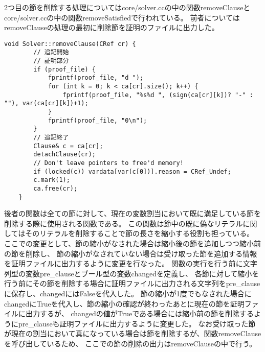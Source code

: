 2つ目の節を削除する処理についてはcore/solver.ccの中の関数removeClauseとcore/solver.ccの中の関数removeSatisfiedで行われている。
前者についてはremoveClauseの処理の最初に削除節を証明のファイルに出力した。
\begin{lstlisting}[caption=関数addClause\_の変更(core/solver.cc), firstnumber=212]
    void Solver::removeClause(CRef cr) {
        // 追記開始
        // 証明部分
        if (proof_file) {
            fprintf(proof_file, "d ");
            for (int k = 0; k < ca[cr].size(); k++) {
                fprintf(proof_file, "%s%d ", (sign(ca[cr][k])? "-" : ""), var(ca[cr][k])+1);
            }
            fprintf(proof_file, "0\n");
        }
        // 追記終了
        Clause& c = ca[cr];
        detachClause(cr);
        // Don't leave pointers to free'd memory!
        if (locked(c)) vardata[var(c[0])].reason = CRef_Undef;
        c.mark(1); 
        ca.free(cr);
    }
\end{lstlisting}
後者の関数は全ての節に対して、現在の変数割当において既に満足している節を削除する際に使用される関数である。
この関数は節中の既に偽なリテラルに関してはそのリテラルを削除することで節の長さを縮小する役割も担っている。
ここでの変更として、節の縮小がなされた場合は縮小後の節を追加しつつ縮小前の節を削除し、
節の縮小がなされていない場合は受け取った節を追加する情報を証明ファイルに出力するように変更を行なった。
関数の実行を行う前に文字列型の変数pre\_clauseとブール型の変数changedを定義し、
各節に対して縮小を行う前にその節を削除する場合に証明ファイルに出力される文字列をpre\_clauseに保存し、changedにはFalseを代入した。
節の縮小が1度でもなされた場合にchangedにTrueを代入し、節の縮小の確認が終わったあとに現在の節を証明ファイルに出力するが、
changedの値がTrueである場合には縮小前の節を削除するようにpre\_clauseも証明ファイルに出力するように変更した。
なお受け取った節が現在の割当において真になっている場合は節を削除するが、関数removeClauseを呼び出しているため、
ここでの節の削除の出力はremoveClauseの中で行う。
